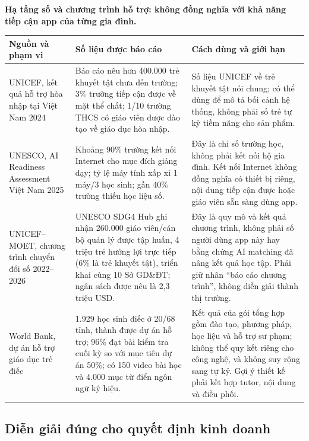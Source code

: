 \documentclass[11pt,a4paper]{article}
\begin{document}
\vspace{5pt}
\textbf{Hạ tầng số và chương trình hỗ trợ: không đồng nghĩa với khả năng tiếp
cận app của từng gia đình.}\par\smallskip\noindent
\begin{tabularx}{\textwidth}{p{3.15cm}p{5.25cm}Y}
\toprule
\textbf{Nguồn và phạm vi} & \textbf{Số liệu được báo cáo} &
\textbf{Cách dùng và giới hạn} \\
\midrule
UNICEF, kết quả hỗ trợ hòa nhập tại Việt Nam 2024 \cite{unicef2025inclusive} &
Báo cáo nêu hơn 400.000 trẻ khuyết tật chưa đến trường; 3\% trường tiếp cận
được về mặt thể chất; 1/10 trường THCS có giáo viên được đào tạo về giáo dục
hòa nhập. &
Số liệu UNICEF về trẻ khuyết tật nói chung; có thể dùng để mô tả bối cảnh hệ
thống, không phải số trẻ tự kỷ tiềm năng cho sản phẩm. \\
\addlinespace
UNESCO, AI Readiness Assessment Việt Nam 2025 \cite{unescoai2025} &
Khoảng 90\% trường kết nối Internet cho mục đích giảng dạy; tỷ lệ máy tính
xấp xỉ 1 máy/3 học sinh; gần 40\% trường thiếu học liệu số. &
Đây là chỉ số trường học, không phải kết nối hộ gia đình. Kết nối Internet
không đồng nghĩa có thiết bị riêng, nội dung tiếp cận được hoặc giáo viên sẵn
sàng dùng app. \\
\addlinespace
UNICEF--MOET, chương trình chuyển đổi số 2022--2026 \cite{unescoedtech2026} &
UNESCO SDG4 Hub ghi nhận 260.000 giáo viên/cán bộ quản lý được tập huấn,
4 triệu trẻ hưởng lợi trực tiếp (6\% là trẻ khuyết tật), triển khai cùng
10 Sở GD\&ĐT; ngân sách được nêu là 2,3 triệu USD. &
Đây là quy mô và kết quả chương trình, không phải số người dùng app này hay
bằng chứng AI matching đã nâng kết quả học tập. Phải giữ nhãn “báo cáo chương
trình”, không diễn giải thành thị trường. \\
\addlinespace
World Bank, dự án hỗ trợ giáo dục trẻ điếc \cite{worldbankdeaf2023} &
1.929 học sinh điếc ở 20/68 tỉnh, thành được dự án hỗ trợ; 96\% đạt bài kiểm
tra cuối kỳ so với mục tiêu dự án 50\%; có 150 video bài học và 4.000 mục từ
điển ngôn ngữ ký hiệu. &
Kết quả của gói tổng hợp gồm đào tạo, phương pháp, học liệu và hỗ trợ sư phạm;
không thể quy kết riêng cho công nghệ, và không suy rộng sang tự kỷ. Gợi ý
thiết kế phải kết hợp tutor, nội dung và điều phối. \\
\bottomrule
\end{tabularx}

\subsection{Diễn giải đúng cho quyết định kinh doanh}
\end{document}
